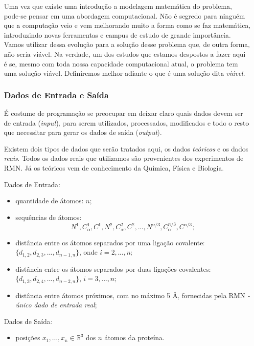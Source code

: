 \documentclass[a4paper,12pt]{article}
\begin{document}
	Uma vez que existe uma introdução a modelagem matemática do problema, pode-se pensar em uma abordagem computacional. Não é segredo para ninguém que a computação veio e vem melhorando muito a forma como se faz matemática, introduzindo novas ferramentas e campus de estudo de grande importância. Vamos utilizar dessa evolução para a solução desse problema que, de outra forma, não seria viável. Na verdade, um dos estudos que estamos despostos a fazer aqui é se, mesmo com toda nossa capacidade computacional atual, o problema tem uma solução viável. Definiremos melhor adiante o que é uma solução dita \textit{viável}. 
	
	\subsubsection*{Dados de Entrada e Saída}
	É costume de programação se preocupar em deixar claro quais dados devem ser de entrada (\textit{input}), para serem utilizados, processados, modificados e todo o resto que necessitar para gerar os dados de saída (\textit{output}).
	
	Existem dois tipos de dados que serão tratados aqui, os dados \textit{teóricos} e os dados \textit{reais}. Todos os dados reais que utilizamos são provenientes dos experimentos de RMN. Já os teóricos vem de conhecimento da Química, Física e Biologia.
	
	\begin{description}
		\item{Dados de Entrada:}
		\begin{itemize}
			\item quantidade de átomos: $n$;
			\item sequências de átomos:
			$$N^1,C^{1}_{\alpha},C^1,N^2,C^{2}_{\alpha},C^2, ...,N^{n/3},C^{n/3}_{\alpha},C^{n/3};
			$$
			\item distância entre os átomos separados por uma ligação covalente: $\{d_{1,2},d_{2,3}, ...,d_{n-1,n}\}$, onde $i = 2, ..., n;$
			\item distância entre os átomos separados por duas ligações covalentes: $\{d_{1,3},d_{2,4}, ...,d_{n-2,n}\}$, $i=3, ..., n;$
			\item distância entre átomos próximos, com no máximo 5 \AA, fornecidas pela RMN \textit{- único dado de entrada real};
		\end{itemize}
		\item{Dados de Saída:}
		\begin{itemize}
			\item posições $x_1, ...,x_n \in\mathbb{R}^3$ dos $n$ átomos da proteína.
		\end{itemize}
	\end{description}
	
\end{document}
